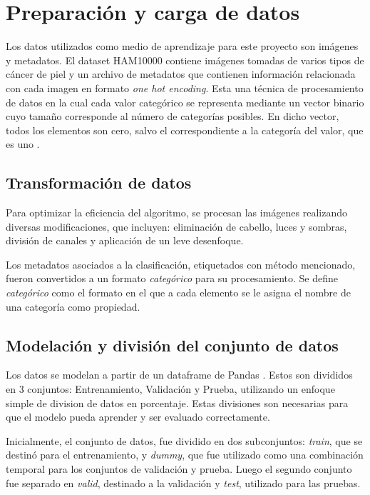 \section{Preparación y carga de datos}

Los datos utilizados como medio de aprendizaje para este proyecto son imágenes y metadatos. El dataset HAM10000 contiene imágenes tomadas de varios tipos de cáncer de piel y un archivo de metadatos que contienen información relacionada con cada imagen en formato \textit{one hot encoding}. Esta una técnica de procesamiento de datos en la cual cada valor categórico se representa mediante un vector binario cuyo tamaño corresponde al número de categorías posibles. En dicho vector, todos los elementos son cero, salvo el correspondiente a la categoría del valor, que es uno .

\subsection{Transformación de datos}

Para optimizar la eficiencia del algoritmo, se procesan las imágenes realizando diversas modificaciones, que incluyen: eliminación de cabello, luces y sombras, división de canales y aplicación de un leve desenfoque.

Los metadatos asociados a la clasificación, etiquetados con método mencionado, fueron convertidos a un formato \textit{categórico}  para su procesamiento. Se define \textit{categórico} como el formato en el que a cada elemento se le asigna el nombre de una categoría como propiedad.

\subsection{Modelación y división del conjunto de datos}

Los datos se modelan a partir de un dataframe de Pandas . Estos son divididos en 3 conjuntos: Entrenamiento, Validación y Prueba, utilizando un enfoque simple de division de datos en porcentaje. Estas divisiones son necesarias para que el modelo pueda aprender y ser evaluado correctamente.

Inicialmente, el conjunto de datos, fue dividido en dos subconjuntos: \textit{train}, que se destinó para el entrenamiento, y \textit{dummy}, que fue utilizado como una combinación temporal para los conjuntos de validación y prueba. Luego el segundo conjunto fue separado en \textit{valid}, destinado a la validación y \textit{test}, utilizado para las pruebas.

